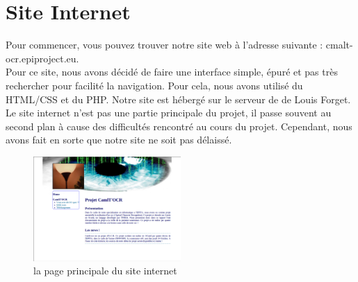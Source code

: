 \section{Site Internet}
Pour commencer, vous pouvez trouver notre site web à l'adresse suivante : cmalt-ocr.epiproject.eu.\\
Pour ce site, nous avons décidé de faire une interface simple, épuré et pas très rechercher pour facilité la navigation. Pour cela, nous avons utilisé du HTML/CSS et du PHP. Notre site est hébergé sur le serveur de de Louis Forget.\\
Le site internet n'est pas une partie principale du projet, il passe souvent au second plan à cause des difficultés rencontré au cours du projet. Cependant, nous avons fait en sorte que notre site ne soit pas délaissé.


\begin{figure}[h]
  \begin{center}
\includegraphics[width=0.50\textwidth]{site.png}
\caption{la page principale du site internet}
\end{center}
\end{figure}